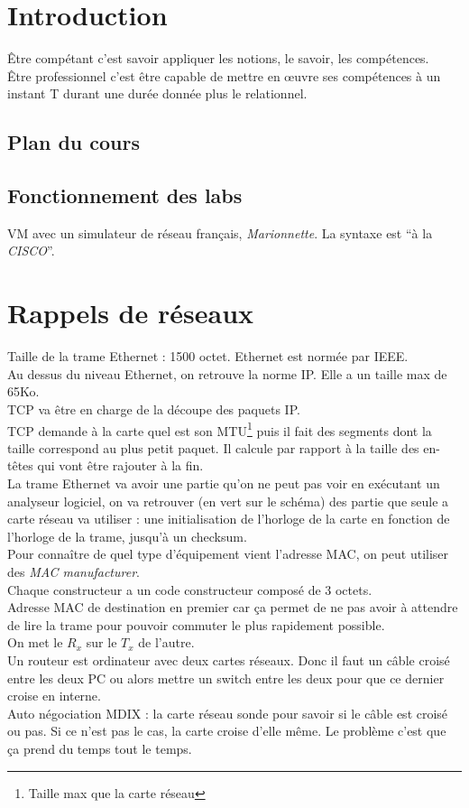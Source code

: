 \section{Introduction}
Être compétant c'est savoir appliquer les notions, le savoir, les compétences.\\
Être professionnel c'est être capable de mettre en œuvre ses compétences à un instant T durant une durée donnée plus le relationnel.
\subsection{Plan du cours}
\subsection{Fonctionnement des labs}
VM avec un simulateur de réseau français, \textit{Marionnette}. La syntaxe est \enquote{à la \textit{CISCO}}.

\section{Rappels de réseaux}
Taille de la trame Ethernet : 1500 octet. Ethernet est normée par IEEE.\\
Au dessus du niveau Ethernet, on retrouve la norme IP. Elle a un taille max de 65Ko.\\
TCP va être en charge de la découpe des paquets IP.\\
TCP demande à la carte quel est son MTU\footnote{Taille max que la carte réseau} puis il fait des segments dont la taille correspond au plus petit paquet. Il calcule par rapport à la taille des en-têtes qui vont être rajouter à la fin.\\
La trame Ethernet va avoir une partie qu'on ne peut pas voir en exécutant un analyseur logiciel, on va retrouver (en vert sur le schéma) des partie que seule a carte réseau va utiliser : une initialisation de l'horloge de la carte en fonction de l'horloge de la trame, jusqu'à un checksum.\\
Pour connaître de quel type d'équipement vient l'adresse MAC, on peut utiliser des \textit{MAC manufacturer}.\\
Chaque constructeur a un code constructeur composé de 3 octets.\\
Adresse MAC de destination en premier car ça permet de ne pas avoir à attendre de lire la trame pour pouvoir commuter le plus rapidement possible.\\
On met le $R_x$ sur le $T_x$ de l'autre.\\
Un routeur est ordinateur avec deux cartes réseaux. Donc il faut un câble croisé entre les deux PC ou alors mettre un switch entre les deux pour que ce dernier croise en interne.\\
Auto négociation MDIX : la carte réseau sonde pour savoir si le câble est croisé ou pas. Si ce n'est pas le cas, la carte croise d'elle même. Le problème c'est que ça prend du temps tout le temps.
